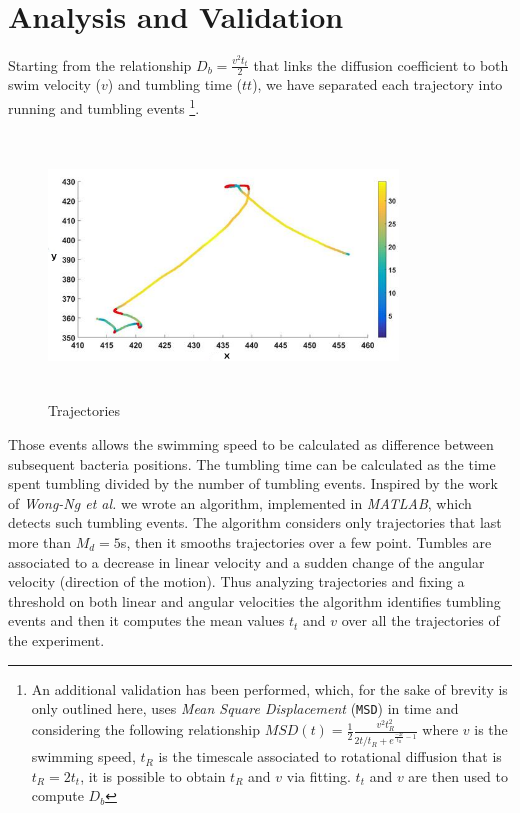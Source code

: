 \documentclass[conference]{IEEEtran}
\begin{document}
\section{Analysis and Validation}
Starting from the relationship $D_b=  \frac{v^2 t_t}{2}$  \cite{Berg:1993} that links the diffusion coefficient to both swim velocity ($v$) and tumbling time ($tt$), 
we have separated each trajectory into running and tumbling events \footnote{An additional validation has been performed, which, for the sake of brevity is only outlined here, uses \textit{Mean Square Displacement} (\texttt{MSD}) in time and considering the following relationship $MSD(t)=\frac{1}{2}\frac{v^2 t_R^2}{2t/t_R +e^{\frac{-2t}{t_R}-1}}$ \cite{Howse:2007} where $v$ is the swimming speed, $t_R$ is the timescale associated to rotational diffusion that is $t_R=2t_t$, it is possible to obtain $t_R $ and $v$ via fitting. $t_t$ and $v$ are then used to compute $D_b$}. 
    \begin{figure}[b]
         \includegraphics[width=9.3cm,height=7cm]{./images/runtumble.png}
        \caption{Trajectories}\label{fig:}
    \end{figure}
Those events allows the swimming speed to be calculated as difference between subsequent bacteria positions. The tumbling time can be calculated as the time spent tumbling divided by the number of tumbling events. Inspired by the work of \textit{Wong-Ng et al.} \cite{Wong2016} we wrote an algorithm, implemented in \textit{MATLAB}, which detects such tumbling events. The algorithm considers only trajectories that last more than $M_d=5$s, then it smooths trajectories over a few point. 
Tumbles are associated to a decrease in linear velocity and a sudden change of the angular velocity (direction of the motion). Thus analyzing trajectories and fixing a threshold on both linear and angular velocities the algorithm identifies tumbling events and then it computes the mean values $t_t$ and $v$ over all the trajectories of the experiment. 
\end{document}
